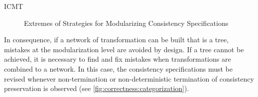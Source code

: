 \begin{copiedFrom}{ICMT}
\begin{figure}[tb]
    \centering
    
    \caption{Extremes of Strategies for Modularizing Consistency Specifications}
    \label{fig:correctness:modularization_strategies}
\end{figure}

In consequence, if a network of transformation can be built that is a tree, mistakes at the modularization level are avoided by design.
If a tree cannot be achieved, it is necessary to find and fix mistakes when transformations are combined to a network.
In this case, the consistency specifications must be revised whenever non-termination or non-deterministic termination of consistency preservation is observed (see \autoref{fig:correctness:categorization}). %



%     


\end{copiedFrom}
